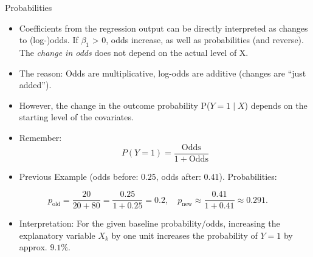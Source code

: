 \documentclass[
  10pt,
  ignorenonframetext,
]{beamer}
\providecommand{\tightlist}{%
  \setlength{\itemsep}{0pt}\setlength{\parskip}{0pt}}\usepackage{longtable,booktabs,array}
\begin{document}
\begin{frame}{Probabilities}
\label{probabilities}
\small

\begin{itemize}
\item
  Coefficients from the regression output can be directly interpreted as
  changes to (log-)odds. If \(\beta_1\) \textgreater{} 0, odds increase,
  as well as probabilities (and reverse). The \emph{change in odds} does
  not depend on the actual level of X.
\item
  The reason: Odds are multiplicative, log-odds are additive (changes
  are ``just added'').
\item
  However, the change in the outcome probability P(\(Y = 1 \mid X\))
  depends on the starting level of the covariates.
\item
  Remember: \[
  P(Y = 1) = \frac{\text{Odds}}{1 + \text{Odds}}
  \]
\item
  Previous Example (odds before: \(0.25\), odds after: \(0.41\)).
  Probabilities:
\end{itemize}

\[
p_{\text{old}} = \frac{20}{20+80} = \frac{0.25}{1 + 0.25} = 0.2, \quad  p_{\text{new}} \approx \frac{0.41}{1 + 0.41} \approx 0.291.
\]

\begin{itemize}
\tightlist
\item
  Interpretation: For the given baseline probability/odds, increasing
  the explanatory variable \(X_k\) by one unit increases the probability
  of \(Y = 1\) by approx. \(9.1\%\).
\end{itemize}
\end{frame}
\end{document}
